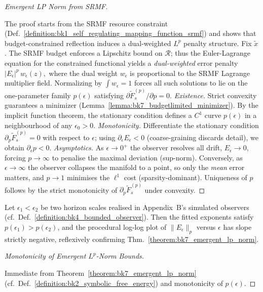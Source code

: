 \begin{proof}[Emergent LP Norm from SRMF]
\label{proof:bk7_emergent_lp_norm_from_srmf}
\leavevmode

The proof starts from the SRMF resource constraint
(Def.~\ref{definition:bk1_self_regulating_mapping_function_srmf}) and shows
that budget-constrained reflection induces a dual-weighted $L^p$ penalty
structure.
Fix $\tilde{x}$.  The SRMF budget enforces a Lipschitz bound on
$\mathcal{R}$; thus the Euler-Lagrange equation for the constrained
functional yields a \emph{dual-weighted} error penalty
\(
|E_{\epsilon}|^{p}\,w_{\epsilon}(z),
\)
where the dual weight $w_{\epsilon}$ is proportional to the SRMF
Lagrange multiplier field.  Normalizing by
$\int w_{\epsilon}\!=\!1$ forces all such solutions to lie on the
one-parameter family $p(\epsilon)$ satisfying
\(
\partial\tilde{F}_{s}^{(p)}/\partial p = 0.
\)
\emph{Existence.}  
Strict convexity guarantees a minimizer
(Lemma~\ref{lemma:bk7_budgetlimited_minimizer}).  
By the implicit function theorem, the stationary
condition defines a $C^{1}$ curve $p(\epsilon)$ in a neighbourhood of
any $\epsilon_{0}>0$.
\emph{Monotonicity.}  
Differentiate the stationary condition
\(
\partial_{p}\tilde{F}_{s}^{(p)}=0
\)
with respect to $\epsilon$; using
$\partial_{\epsilon}E_{\epsilon}<0$ (coarse-graining discards detail),
we obtain
\(
\partial_{\epsilon}p < 0.
\)
\emph{Asymptotics.}  
As $\epsilon\!\to\! 0^{+}$ the observer resolves all drift,
$E_{\epsilon}\!\to\!0$, forcing $p\!\to\!\infty$ to penalise the
maximal deviation (sup-norm).  
Conversely, as $\epsilon\!\to\!\infty$ the
observer collapses the manifold to a point,
so only the \emph{mean} error matters, and
$p\!\to\!1$ minimises the $\ell^{1}$ cost (sparsity-dominant).
Uniqueness of $p$ follows by the strict monotonicity of
$\partial_{p}\tilde{F}_{s}^{(p)}$ under convexity.
\end{proof}
\begin{corollary}
\label{corollary:bk7_procedural_detection}
Let $\epsilon_{1}<\epsilon_{2}$ be two horizon scales realised in
Appendix~B's simulated observers (cf.~Def.~\ref{definition:bk4_bounded_observer}).
Then the fitted exponents satisfy $p(\epsilon_{1})>p(\epsilon_{2})$, and the procedural
log-log plot of
\(
\lVert E_{\epsilon}\rVert_{p}
\)
versus $\epsilon$ has slope strictly negative, reflexively
confirming Thm.~\ref{theorem:bk7_emergent_lp_norm}.
\end{corollary}
\begin{proof}[Monotonicity of Emergent \( L^p \)-Norm Bounds]
\label{proof:bk7_lp_norm_monotonicity}
\leavevmode

Immediate from Theorem~\ref{theorem:bk7_emergent_lp_norm}
(cf.~Def.~\ref{definition:bk2_symbolic_free_energy}) and monotonicity of
$p(\epsilon)$.
\end{proof}
